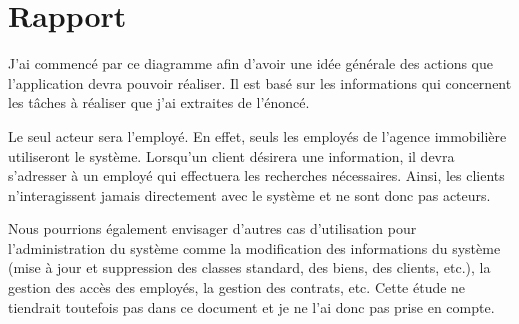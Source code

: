 \section{Rapport}

J'ai commencé par ce diagramme afin d'avoir une idée générale des actions que l'application devra pouvoir réaliser. Il est basé sur les informations qui concernent les tâches à réaliser que j'ai extraites de l'énoncé.

Le seul acteur sera l'employé. En effet, seuls les employés de l'agence immobilière utiliseront le système. Lorsqu'un client désirera une information, il devra s'adresser à un employé qui effectuera les recherches nécessaires. Ainsi, les clients n'interagissent jamais directement avec le système et ne sont donc pas acteurs.

Nous pourrions également envisager d'autres cas d'utilisation pour l'administration du système comme la modification des informations du système (mise à jour et suppression des classes standard, des biens, des clients, etc.), la gestion des accès des employés, la gestion des contrats, etc. Cette étude ne tiendrait toutefois pas dans ce document et je ne l'ai donc pas prise en compte.